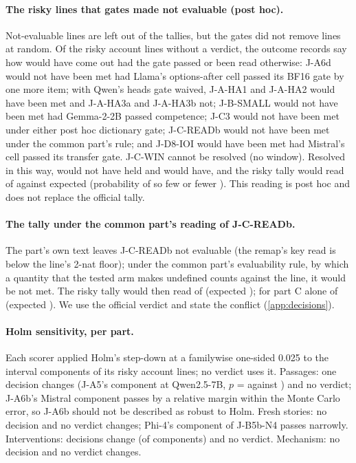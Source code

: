 \paragraph{The risky lines that gates made not evaluable (post hoc).} Not-evaluable lines are left out of the tallies, but the gates did not remove lines at random. Of the \JxRiskyNotEvalABCD{} risky account lines without a verdict, the outcome records say how \JxRiskySensResolved{} would have come out had the gate passed or been read otherwise: J-A6d would not have been met had Llama's options-after cell passed its BF16 gate by one more item; with Qwen's heads gate waived, J-A-HA1 and J-A-HA2 would have been met and J-A-HA3a and J-A-HA3b not; J-B-SMALL would not have been met had Gemma-2-2B passed competence; J-C3 would not have been met under either post hoc dictionary gate; J-C-READb would not have been met under the common part's rule; and J-D8-IOI would have been met had Mistral's cell passed its transfer gate. J-C-WIN cannot be resolved (no window). Resolved in this way, \JxRiskySensNotHeld{} would not have held and \JxRiskySensHeld{} would have, and the risky tally would read \JxRiskySensMet{} of \JxRiskySensVerd{} against \JxRiskySensExp{} expected (probability of so few or fewer \JxRiskySensTailP{}). This reading is post hoc and does not replace the official tally.

\paragraph{The tally under the common part's reading of J-C-READb.} The part's own text leaves J-C-READb not evaluable (the remap's key read is below the line's 2-nat floor); under the common part's evaluability rule, by which a quantity that the tested arm makes undefined counts against the line, it would be not met. The risky tally would then read \JxRiskyMetABCDAlt{} of \JxRiskyVerdABCDAlt{} (expected \JxRiskyExpABCDAlt{}); for part C alone \JxRiskyMetCAlt{} of \JxRiskyVerdCAlt{} (expected \JxRiskyExpCAlt{}). We use the official verdict and state the conflict (\cref{app:decisions}).

\paragraph{Holm sensitivity, per part.} Each scorer applied Holm's step-down at a familywise one-sided 0.025 to the interval components of its risky account lines; no verdict uses it. Passages: one decision changes (J-A5's component at Qwen2.5-7B, $p$ = \JaHolmP{} against \JaHolmThr{}) and no verdict; J-A6b's Mistral component passes by a relative margin within the Monte Carlo error, so J-A6b should not be described as robust to Holm. Fresh stories: no decision and no verdict changes; Phi-4's component of J-B5b-N4 passes narrowly. Interventions: \JcHolmChanged{} decisions change (of \JcHolmN{} components) and no verdict. Mechanism: no decision and no verdict changes.

